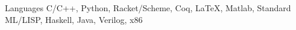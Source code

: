
\begin{cvskills}

  \cvskill
    {Languages} %
    {C/C++, Python, Racket/Scheme, Coq, LaTeX, Matlab, Standard ML/LISP, Haskell, Java, Verilog, x86} %

\end{cvskills}
